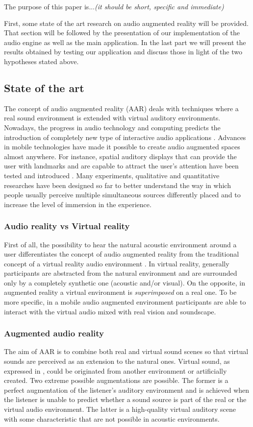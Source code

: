 \documentclass[journal]{IEEEtran}
\begin{document}
The purpose of this paper is...\textit{(it should be short, specific and immediate)}

First, some state of the art research on audio augmented reality will be provided. That section will be followed by the presentation of our implementation of the audio engine as well as the main application. In the last part we will present the results obtained by testing our application and discuss those in light of the two hypotheses stated above.



\subsection{State of the art}
The concept of audio augmented reality (AAR) deals with techniques where a real sound environment is extended with virtual auditory environments. Nowadays, the progress in audio technology and computing predicts the introduction of completely new type of interactive audio applications \cite{}. Advances in mobile technologies have made it possible to create audio augmented spaces almost anywhere. For instance, spatial auditory displays that can provide the user with landmarks and are capable to attract the user's attention have been tested and introduced \cite{}. Many experiments, qualitative and quantitative researches have been designed so far to better understand the way in which people usually perceive multiple simultaneous sources differently placed and to increase the level of immersion in the experience.

\subsubsection{Audio reality vs Virtual reality}
First of all, the possibility to hear the natural acoustic environment around a user differentiates the concept of audio augmented reality from the traditional concept of a virtual reality audio environment \cite{}. In virtual reality, generally participants are abstracted from the natural environment and are surrounded only by a completely synthetic one (acoustic and/or visual). On the opposite, in augmented reality a virtual environment is \emph{superimposed} on a real one. To be more specific, in a mobile audio augmented environment participants are able to interact with the virtual audio mixed with real vision and soundscape.

\subsubsection{Augmented audio reality}
The aim of AAR is to combine both real and virtual sound scenes so that virtual sounds are perceived as an extension to the natural ones. Virtual sound, as expressed in \cite{}, could be originated from another environment or artificially created. Two extreme possible augmentations are possible. The former is a perfect augmentation of the listener's auditory environment and is achieved when the listener is unable to predict whether a sound source is part of the real or the virtual audio environment. The latter is a high-quality virtual auditory scene with some characteristic that are not possible in acoustic environments.
\end{document}
